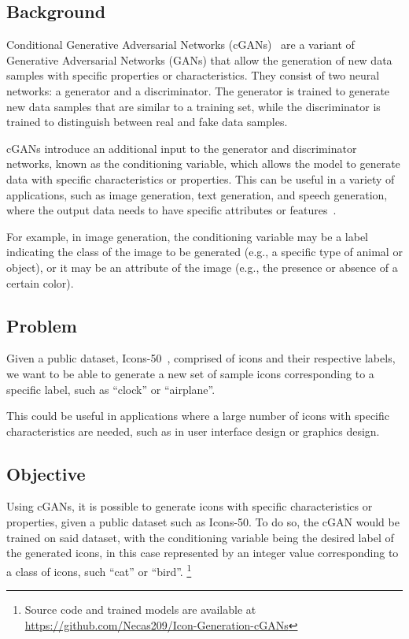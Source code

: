 \subsection{Background}\label{subsec:background}
Conditional Generative Adversarial Networks (cGANs)~\cite{Mirza2014} are a variant of Generative Adversarial Networks
(GANs) that allow the generation of new data samples with specific properties or characteristics.
They consist of two neural networks: a generator and a discriminator.
The generator is trained to generate new data samples that are similar to a training set, while the discriminator is
trained to distinguish between real and fake data samples.

cGANs introduce an additional input to the generator and discriminator networks, known as the conditioning variable,
which allows the model to generate data with specific characteristics or properties.
This can be useful in a variety of applications, such as image generation, text generation, and speech generation, where
the output data needs to have specific attributes or features~\cite{Mirza2014}.

For example, in image generation, the conditioning variable may be a label indicating the class of the image to be generated (e.g., a specific type of animal or object), or it may be an attribute of the image (e.g., the presence or absence of a certain color).

\subsection{Problem}\label{subsec:problem}
Given a public dataset, Icons-50~\cite{Icons50, Hendrycks2018}, comprised of icons and their respective labels, we want to be able to generate a new set of sample icons corresponding to a specific label, such as ``clock'' or ``airplane''.

This could be useful in applications where a large number of icons with specific characteristics are needed, such as in user interface design or graphics design.

\subsection{Objective}\label{subsec:objective}
Using cGANs, it is possible to generate icons with specific characteristics or properties, given a public dataset such as Icons-50.
To do so, the cGAN would be trained on said dataset, with the conditioning variable being the desired label of the generated icons, in this case represented by an integer value corresponding to a class of icons, such ``cat'' or ``bird''.
\footnote{Source code and trained models are available at   \url{https://github.com/Necas209/Icon-Generation-cGANs}}

